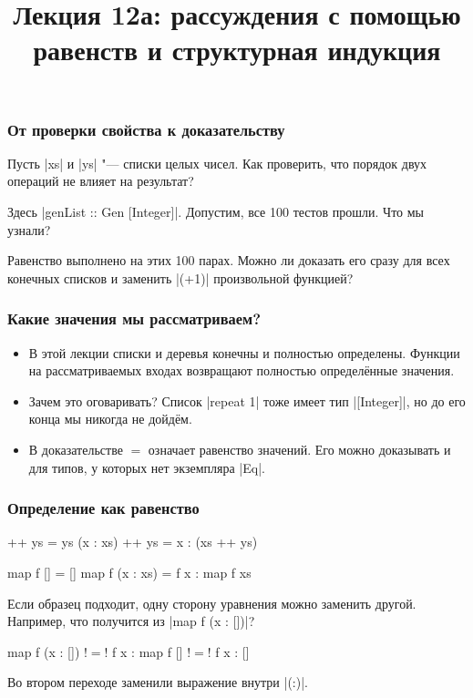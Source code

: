 \documentclass[11pt]{beamer}
\title{Лекция 12а: рассуждения с помощью равенств и структурная индукция}
\begin{document}
\begin{frame}[plain]
  \maketitle
\end{frame}

\begin{frame}[fragile]
  \frametitle{От проверки свойства к доказательству}
  Пусть \haskinline|xs| и \haskinline|ys| "--- списки целых чисел. Как проверить, что порядок двух операций не влияет на результат?
  Здесь \haskinline|genList :: Gen [Integer]|. Допустим, все 100 тестов прошли. Что мы узнали? \pause

  Равенство выполнено на этих 100 парах. Можно ли доказать его сразу для всех конечных списков и заменить \haskinline|(+1)| произвольной функцией?
\end{frame}

\begin{frame}[fragile]
  \frametitle{Какие значения мы рассматриваем?}
  \begin{itemize}
    \item В этой лекции списки и деревья конечны и полностью определены. Функции на рассматриваемых входах возвращают полностью определённые значения.
    \item Зачем это оговаривать? Список \haskinline|repeat 1| тоже имеет тип \haskinline|[Integer]|, но до его конца мы никогда не дойдём. \pause
    \item В доказательстве $=$ означает равенство значений. Его можно доказывать и для типов, у которых нет экземпляра \haskinline|Eq|.
  \end{itemize}
\end{frame}

\begin{frame}[fragile]
  \frametitle{Определение как равенство}
  \begin{haskell}
    []       ++ ys = ys
    (x : xs) ++ ys = x : (xs ++ ys)

    map f []       = []
    map f (x : xs) = f x : map f xs
  \end{haskell}
  Если образец подходит, одну сторону уравнения можно заменить другой. Например, что получится из \haskinline|map f (x : [])|? \pause
  \begin{haskell}
      map f (x : [])
    !$=$! f x : map f []
    !$=$! f x : []
  \end{haskell}
  Во втором переходе заменили выражение внутри \haskinline|(:)|.
\end{frame}
\end{document}
